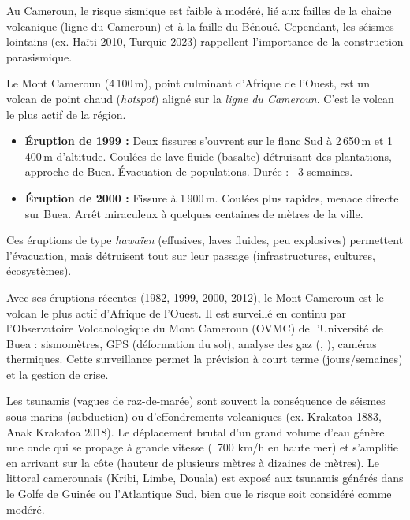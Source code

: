 \documentclass[11pt]{article}
\newcommand{\cle}[1]{{\popxbold\color{popdark}#1}}
\begin{document}
\noindent Au Cameroun, le risque sismique est faible à modéré, lié aux failles de la chaîne volcanique (ligne du Cameroun) et à la faille du Bénoué. Cependant, les séismes lointains (ex. Haïti 2010, Turquie 2023) rappellent l'importance de la construction parasismique.

\begin{exemplebox}
Le \cle{Mont Cameroun} (4\,100\,m), point culminant d'Afrique de l'Ouest, est un volcan de point chaud (\emph{hotspot}) aligné sur la \emph{ligne du Cameroun}. C'est le volcan le plus actif de la région.
\begin{itemize}
    \item \textbf{Éruption de 1999 :} Deux fissures s'ouvrent sur le flanc Sud à 2\,650\,m et 1\,400\,m d'altitude. Coulées de lave fluide (basalte) détruisant des plantations, approche de Buea. Évacuation de populations. Durée : ~3 semaines.
    \item \textbf{Éruption de 2000 :} Fissure à 1\,900\,m. Coulées plus rapides, menace directe sur Buea. Arrêt miraculeux à quelques centaines de mètres de la ville.
\end{itemize}
Ces éruptions de type \emph{hawaïen} (effusives, laves fluides, peu explosives) permettent l'évacuation, mais détruisent tout sur leur passage (infrastructures, cultures, écosystèmes).
\end{exemplebox}

\begin{savaistu}
Avec ses éruptions récentes (1982, 1999, 2000, 2012), le Mont Cameroun est le volcan le plus actif d'Afrique de l'Ouest. Il est surveillé en continu par l'Observatoire Volcanologique du Mont Cameroun (OVMC) de l'Université de Buea : sismomètres, GPS (déformation du sol), analyse des gaz (, ), caméras thermiques. Cette surveillance permet la \cle{prévision} à court terme (jours/semaines) et la gestion de crise.
\end{savaistu}

\noindent Les \cle{tsunamis} (vagues de raz-de-marée) sont souvent la conséquence de séismes sous-marins (subduction) ou d'effondrements volcaniques (ex. Krakatoa 1883, Anak Krakatoa 2018). Le déplacement brutal d'un grand volume d'eau génère une onde qui se propage à grande vitesse (~700 km/h en haute mer) et s'amplifie en arrivant sur la côte (hauteur de plusieurs mètres à dizaines de mètres). Le littoral camerounais (Kribi, Limbe, Douala) est exposé aux tsunamis générés dans le Golfe de Guinée ou l'Atlantique Sud, bien que le risque soit considéré comme modéré.
\end{document}
